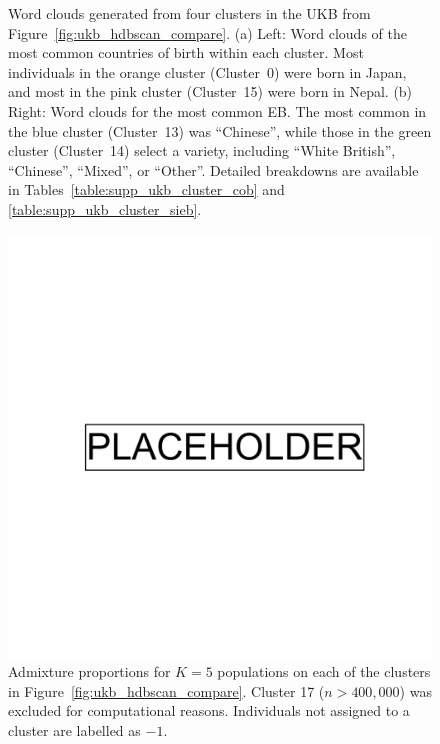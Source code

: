 \begin{figure}[ht]
\begin{subfigure}[b]{0.45\linewidth}
    \caption{}
    \label{fig:supp_ukb_hdbscan_top2}
  \end{subfigure}
  \caption[Word clouds generated from four clusters in the UKB]{Word clouds generated from four clusters in the UKB from Figure~\ref{fig:ukb_hdbscan_compare}. (a) Left: Word clouds of the most common countries of birth within each cluster. Most individuals in the orange cluster (Cluster~0) were born in Japan, and most in the pink cluster (Cluster~15) were born in Nepal. (b) Right: Word clouds for the most common EB. The most common in the blue cluster (Cluster~13) was ``Chinese'', while those in the green cluster (Cluster~14) select a variety, including ``White British'', ``Chinese'', ``Mixed'', or ``Other''. Detailed breakdowns are available in Tables~\ref{table:supp_ukb_cluster_cob} and \ref{table:supp_ukb_cluster_sieb}.}
  \label{fig:supp_ukb_hdbscan_top}
\end{figure}

\begin{figure}[ht]
  \centering
    \includegraphics[width=0.8\linewidth]{placeholder.png}
    \caption[Admixture proportions for 5 populations]{Admixture proportions for $K=5$ populations on each of the clusters in Figure~\ref{fig:ukb_hdbscan_compare}. Cluster 17 ($n>400,000$) was excluded for computational reasons. Individuals not assigned to a cluster are labelled as $-1$.}
  \label{fig:supp_ukb_admix}
\end{figure}

\clearpage


